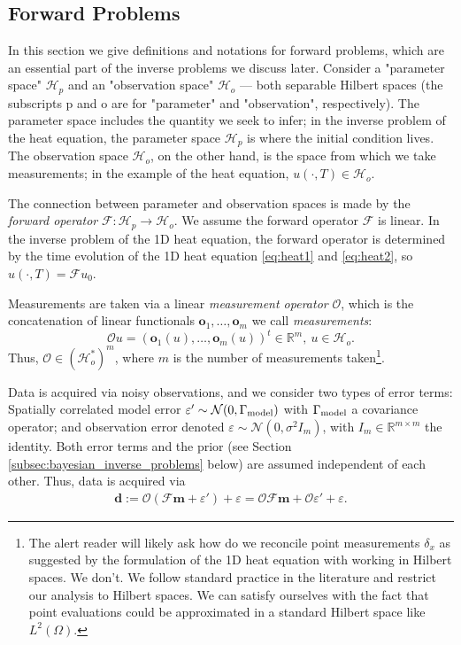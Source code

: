 \documentclass[ba]{imsart}
\newcommand{\R}{\ensuremath{\mathbb{R}}}
\newcommand{\eps}{\varepsilon}
\newcommand{\hilp}{\mathcal{H}_p}
\newcommand{\hilo}{\mathcal{H}_o}
\newcommand{\obs}{\mathcal{O}}
\newcommand{\fwd}{\mathcal{F}}
\newcommand{\data}{\mathbf{d}}
\newcommand{\param}{\mathbf{m}}
\newcommand{\normal}{\mathcal{N}}
\newcommand{\meas}{\mathbf{o}}
\theoremstyle{plain}
\theoremstyle{definition}
\theoremstyle{remark}
\begin{document}
\subsection{Forward Problems}\label{subsec:abstract_OED}
In this section we give definitions and notations for forward
problems, which are an essential part of the inverse problems we
discuss later. Consider a "parameter space" \(\hilp\) and an
"observation space" \(\hilo\) --- both separable Hilbert spaces (the
subscripts p and o are for "parameter" and "observation",
respectively). The parameter space includes the quantity we seek to
infer; in the inverse problem of the heat equation, the parameter
space $\hilp$ is where the initial condition lives. The observation
space $\hilo$, on the other hand, is the space from which we take
measurements; in the example of the heat equation, $u(\cdot, T) \in
\hilo$.

The connection between parameter and observation spaces is made by the
\emph{forward operator} \(\fwd: \hilp \to \hilo\). We assume the
forward operator \(\fwd\) is linear. In the inverse problem of the 1D
heat equation, the forward operator is determined by the time
evolution of the 1D heat equation \eqref{eq:heat1} and
\eqref{eq:heat2}, so $u(\cdot, T) = \fwd u_0$.

Measurements are taken via a linear \emph{measurement operator}
\(\obs\), which is the concatenation of linear functionals
$\meas_1,\dots,\meas_m$ we call \emph{measurements}:
\begin{equation*}\obs u = (\meas_1(u), \dots, \meas_m(u) )^t \in \R^m,\ u \in \hilo.
\end{equation*}
Thus, \(\obs \in ( \hilo^* )^m\), where \(m\) is the number of
measurements taken\footnote{The alert reader will likely ask how do we
reconcile point measurements $\delta_x$ as suggested by the
formulation of the 1D heat equation with working in Hilbert spaces. We
don't. We follow standard practice in the literature and restrict our
analysis to Hilbert spaces. We can satisfy ourselves with the fact
that point evaluations could be approximated in a standard Hilbert
space like $L^2(\Omega)$.}. 

Data is acquired via noisy observations, and we consider two types of
error terms: Spatially correlated model error \(\eps' \sim
\normal(0,\modcov)\) with \(\Gamma_{\textup{model}}\) a covariance operator; and
observation error denoted \(\eps \sim \normal(0, \sigma^2 I_m)\), with
\(I_m \in \mathbb{R}^{m \times m}\) the identity. Both error terms and
the prior (see Section \ref{subsec:bayesian_inverse_problems} below)
are assumed independent of each other. Thus, data is acquired via
\begin{align}\label{eq:inverse_problem}
  \data := \obs (\fwd \param + \eps') + \eps = \obs \fwd \param + \obs \eps' + \eps.
\end{align}
\end{document}
